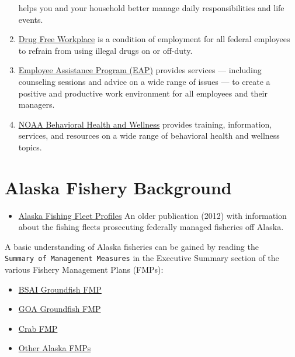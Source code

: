 \documentclass[
  letterpaper,
  DIV=11,
  numbers=noendperiod]{scrreprt}
\providecommand{\tightlist}{%
  \setlength{\itemsep}{0pt}\setlength{\parskip}{0pt}}\usepackage{longtable,booktabs,array}
\begin{document}
\begin{enumerate}
  helps you and your household better manage daily responsibilities and
  life events.
\item
  \href{https://sites.google.com/noaa.gov/ohcs/employee-resources/work-life-resources/workplace-programs/drug-free-workplace-program}{Drug
  Free Workplace} is a condition of employment for all federal employees
  to refrain from using illegal drugs on or off-duty.
\item
  \href{https://sites.google.com/noaa.gov/ohcs/employee-resources/work-life-resources/workplace-programs/employee-assistance-program-eap}{Employee
  Assistance Program (EAP)} provides services --- including counseling
  sessions and advice on a wide range of issues --- to create a positive
  and productive work environment for all employees and their managers.
\item
  \href{https://sites.google.com/noaa.gov/behavioral-health-and-wellness/home}{NOAA
  Behavioral Health and Wellness} provides training, information,
  services, and resources on a wide range of behavioral health and
  wellness topics.
\end{enumerate}

\chapter{Alaska Fishery Background}\label{alaska-fishery-background}

\begin{itemize}
\tightlist
\item
  \href{https://www.npfmc.org/wp-content/PDFdocuments/resources/FleetProfiles412.pdf}{Alaska
  Fishing Fleet Profiles} An older publication (2012) with information
  about the fishing fleets prosecuting federally managed fisheries off
  Alaska.
\end{itemize}

A basic understanding of Alaska fisheries can be gained by reading the
\texttt{Summary\ of\ Management\ Measures} in the Executive Summary
section of the various Fishery Management Plans (FMPs):

\begin{itemize}
\tightlist
\item
  \href{https://www.npfmc.org/wp-content/uploads/BSAIfmp.pdf}{BSAI
  Groundfish FMP}
\item
  \href{https://www.npfmc.org/wp-content/PDFdocuments/fmp/GOA/GOAfmp.pdf}{GOA
  Groundfish FMP}
\item
  \href{https://www.npfmc.org/wp-content/PDFdocuments/fmp/Crab/CrabFMP.pdf}{Crab
  FMP}
\item
  \href{https://www.npfmc.org/library/fmps-feps/}{Other Alaska FMPs}
\end{itemize}
\end{document}
